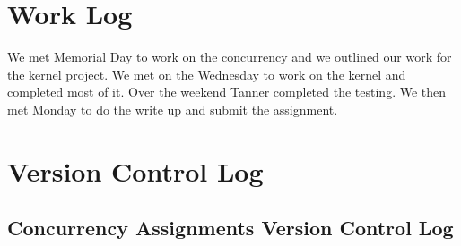 \documentclass[letterpaper,10pt,serif,draftclsnofoot,onecolumn,compsoc,titlepage]{IEEEtran}
\begin{document}
\section{Work Log}
We met Memorial Day to work on the concurrency and we outlined our work for the kernel project.
We met on the Wednesday to work on the kernel and completed most of it. Over the weekend Tanner 
completed the testing. We then met Monday to do the write up and submit the assignment. 
\section{Version Control Log}
\subsection{Concurrency Assignments Version Control Log}
\end{document}
